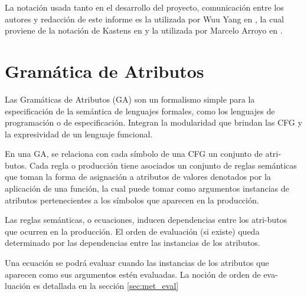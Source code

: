 La notación usada tanto en el desarrollo del proyecto, comunicación entre los autores y redacción de este informe es la utilizada por Wuu Yang en \cite{wuu-yang1}, la cual proviene de la notación de Kastens en \cite{kastens} y la utilizada por Marcelo Arroyo en \cite{tesismarcelo}.

\section{Gramática de Atributos}

Las Gramáticas de Atributos (GA) son un formalismo simple para la especificación de la semántica de lenguajes formales, como los lenguajes de programación o de especificación. Integran la modularidad que brindan las CFG y la expresividad de un lenguaje funcional.

En una GA, se relaciona con cada símbolo de una CFG un conjunto de atri-butos. Cada regla o producción tiene asociados un conjunto de reglas semánticas que toman la forma de asignación a atributos de valores denotados por la aplicación de una función, la cual puede tomar como argumentos instancias de atributos pertenecientes a los símbolos que aparecen en la producción.

Las reglas semánticas, o ecuaciones, inducen dependencias entre los atri-butos que ocurren en la producción. El orden de evaluación (si existe) queda determinado por las dependencias entre las instancias de los atributos.

Una ecuación se podrá evaluar cuando las instancias de los atributos que aparecen como sus argumentos estén evaluadas. La noción de orden de eva-luación es detallada en la sección \ref{sec:met_eval}


